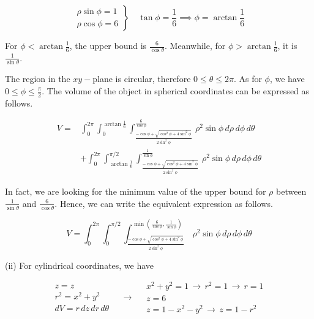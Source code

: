 \documentclass{article}
\begin{document}
\[
\left.
\begin{array}{c}
\rho\sin\phi=1\\
\rho\cos\phi=6
\end{array}
\right\}\quad\tan\phi=\frac16\implies\phi=\arctan{\frac16}
\]

\hfill

\noindent For $\displaystyle\phi<\arctan\frac16$, the upper bound is $\displaystyle \frac6{\cos\theta}$. Meanwhile, for $\displaystyle\phi>\arctan\frac16$, it is $\displaystyle \frac1{\sin\theta}$.

\hfill

\noindent The region in the $xy-$plane is circular, therefore $0\leq\theta\leq2\pi$. As for $\phi$, we have $\displaystyle0\leq\phi\leq\frac{\pi}2$. The volume of the object in spherical coordinates can be expressed as follows.

\begin{equation*}
\boxed{\begin{array}{cc}
V=&\displaystyle\int_0^{2\pi}\int_0^{\arctan{\textstyle\frac16}}\int_{\textstyle\frac{-\cos\phi +\sqrt{\cos^2\phi+4\sin^2\phi}}{2\sin^2\phi}}^{\textstyle\frac6{\cos\phi}}\,\rho^2\sin\phi\,d\rho\,d\phi\,d\theta\\
&\displaystyle+\int_0^{2\pi}\int_{\arctan{\textstyle\frac16}}^{\pi/2}\int_{\textstyle\frac{-\cos\phi +\sqrt{\cos^2\phi+4\sin^2\phi}}{2\sin^2\phi}}^{\textstyle\frac1{\sin\phi}}\,\rho^2\sin\phi\,d\rho\,d\phi\,d\theta 
\end{array}}
\end{equation*}

\hfill

\noindent In fact, we are looking for the minimum value of the upper bound for $\rho$ between $\displaystyle\frac1{\sin\theta}$ and $\displaystyle\frac6{\cos\theta}$. Hence, we can write the equivalent expression as follows.

\begin{equation*}
\boxed{V=\displaystyle\int_0^{2\pi}\int_0^{\pi/2}\int_{\textstyle\frac{-\cos\phi +\sqrt{\cos^2\phi+4\sin^2\phi}}{2\sin^2\phi}}^{\min\left(\textstyle\frac6{\cos\phi},\frac1{\sin\phi}\right)}\,\rho^2\sin\phi\,d\rho\,d\phi\,d\theta}
\end{equation*}

\hfill

\noindent (ii) For cylindrical coordinates, we have

\[
\begin{array}{c}
z=z\\
r^2=x^2+y^2\\
dV=r\,dz\,dr\,d\theta
\end{array}\quad\rightarrow\quad
\begin{array}{c}
x^2+y^2=1\,\rightarrow\,r^2 = 1\,\rightarrow\,r=1\\
z=6\\
z=1-x^2-y^2\,\rightarrow\,z=1-r^2
\end{array}
\]
\end{document}
